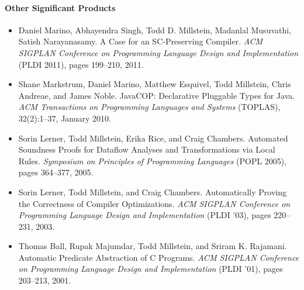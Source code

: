 \documentclass[11pt]{article}
\begin{document}
\paragraph{Other Significant Products}
\begin{itemize}

\item Daniel Marino, Abhayendra Singh, Todd D. Millstein, Madanlal
  Musuvathi, Satish Narayanasamy.
 A Case for an SC-Preserving Compiler. {\em ACM SIGPLAN Conference on
   Programming Language Design and Implementation} (PLDI 2011), pages
 199--210, 2011.

\item Shane Markstrum, Daniel Marino, Matthew Esquivel, Todd
  Millstein, Chris Andreae, and James Noble.
JavaCOP: Declarative Pluggable Types for Java.
{\em ACM Transactions on Programming Languages and
  Systems} (TOPLAS), 32(2):1--37, January 2010. 

\item Sorin Lerner, Todd Millstein, Erika Rice, and Craig Chambers.
  Automated Soundness Proofs for Dataflow Analyses and Transformations
  via Local Rules.  {\em Symposium on Principles of Programming
    Languages} (POPL 2005), pages 364--377, 2005.

\item Sorin Lerner, Todd Millstein, and Craig Chambers.
  Automatically Proving the Correctness of Compiler Optimizations.
  {\em 
ACM SIGPLAN
Conference on Programming Language Design and Implementation} (PLDI
'03), pages 220--231, 2003.

\item Thomas Ball, Rupak Majumdar, Todd Millstein, and Sriram
  K. Rajamani.
  Automatic Predicate Abstraction of C Programs.
  {\em
ACM SIGPLAN
Conference on Programming Language Design and Implementation} (PLDI
'01), pages 203--213, 2001.

\end{itemize}
\end{document}
